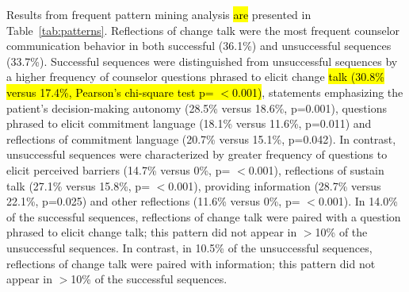 Results from frequent pattern mining analysis \hl{are} presented in Table~\ref{tab:patterns}. Reflections of change talk were the most frequent counselor communication behavior in both successful (36.1\%) and unsuccessful sequences (33.7\%). Successful sequences were distinguished from unsuccessful sequences by a higher frequency of counselor questions phrased to elicit change \hl{talk (30.8\% versus 17.4\%, Pearson's chi-square test p= $<$0.001)}, statements emphasizing the patient's decision-making autonomy (28.5\% versus 18.6\%, p=0.001), questions phrased to elicit commitment language (18.1\% versus 11.6\%, p=0.011) and reflections of commitment language (20.7\% versus 15.1\%, p=0.042). In contrast, unsuccessful sequences were characterized by greater frequency of questions to elicit perceived barriers (14.7\% versus 0\%, p= $<$0.001), reflections of sustain talk (27.1\% versus 15.8\%, p= $<$0.001), providing information (28.7\% versus 22.1\%, p=0.025) and other reflections (11.6\% versus 0\%, p= $<$0.001). In 14.0\% of the successful sequences, reflections of change talk were paired with a question phrased to elicit change talk; this pattern did not appear in $>$10\% of the unsuccessful sequences. In contrast, in 10.5\% of the unsuccessful sequences, reflections of change talk were paired with information; this pattern did not appear in $>$10\% of the successful sequences.

